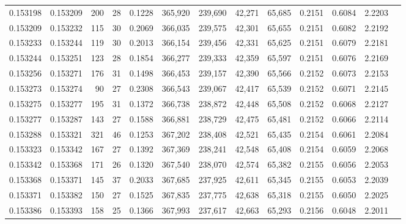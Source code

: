 \begin{tabular}{rrrrrrrrrrrrr}
0.153198 & 0.153209 &   200 &  28 &                                     0.1228 & 365,920 & 239,690 &  42,271 &  65,685 & 0.2151 & 0.6084 & 2.2203 \\
0.153209 & 0.153232 &   115 &  30 &                                     0.2069 & 366,035 & 239,575 &  42,301 &  65,655 & 0.2151 & 0.6082 & 2.2192 \\
0.153233 & 0.153244 &   119 &  30 &                                     0.2013 & 366,154 & 239,456 &  42,331 &  65,625 & 0.2151 & 0.6079 & 2.2181 \\
0.153244 & 0.153251 &   123 &  28 &                                     0.1854 & 366,277 & 239,333 &  42,359 &  65,597 & 0.2151 & 0.6076 & 2.2169 \\
0.153256 & 0.153271 &   176 &  31 &                                     0.1498 & 366,453 & 239,157 &  42,390 &  65,566 & 0.2152 & 0.6073 & 2.2153 \\
0.153273 & 0.153274 &    90 &  27 &                                     0.2308 & 366,543 & 239,067 &  42,417 &  65,539 & 0.2152 & 0.6071 & 2.2145 \\
0.153275 & 0.153277 &   195 &  31 &                                     0.1372 & 366,738 & 238,872 &  42,448 &  65,508 & 0.2152 & 0.6068 & 2.2127 \\
0.153277 & 0.153287 &   143 &  27 &                                     0.1588 & 366,881 & 238,729 &  42,475 &  65,481 & 0.2152 & 0.6066 & 2.2114 \\
0.153288 & 0.153321 &   321 &  46 &                                     0.1253 & 367,202 & 238,408 &  42,521 &  65,435 & 0.2154 & 0.6061 & 2.2084 \\
0.153323 & 0.153342 &   167 &  27 &                                     0.1392 & 367,369 & 238,241 &  42,548 &  65,408 & 0.2154 & 0.6059 & 2.2068 \\
0.153342 & 0.153368 &   171 &  26 &                                     0.1320 & 367,540 & 238,070 &  42,574 &  65,382 & 0.2155 & 0.6056 & 2.2053 \\
0.153368 & 0.153371 &   145 &  37 &                                     0.2033 & 367,685 & 237,925 &  42,611 &  65,345 & 0.2155 & 0.6053 & 2.2039 \\
0.153371 & 0.153382 &   150 &  27 &                                     0.1525 & 367,835 & 237,775 &  42,638 &  65,318 & 0.2155 & 0.6050 & 2.2025 \\
0.153386 & 0.153393 &   158 &  25 &                                     0.1366 & 367,993 & 237,617 &  42,663 &  65,293 & 0.2156 & 0.6048 & 2.2011 \\

\end{tabular}
